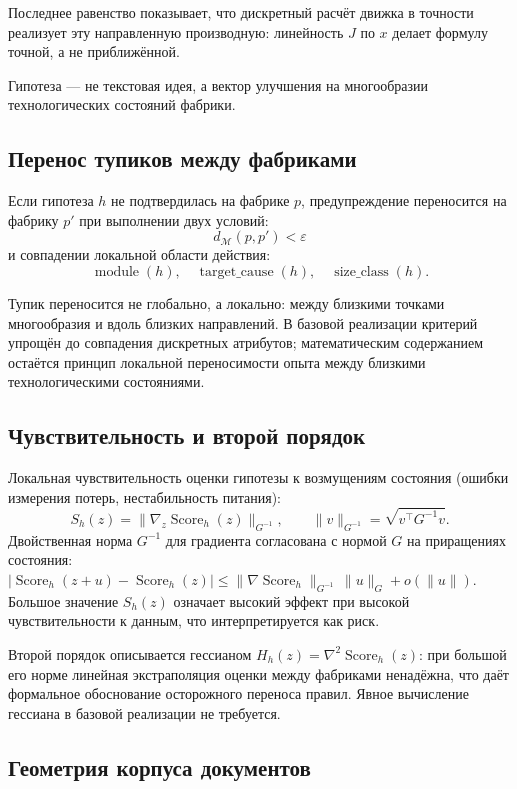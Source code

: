 \documentclass[12pt,a4paper]{article}
\newcommand{\Manifold}{\mathcal{M}}
\DeclareMathOperator{\Score}{Score}
\begin{document}
Последнее равенство показывает, что дискретный расчёт движка в точности
реализует эту направленную производную: линейность \(J\) по \(x\) делает
формулу точной, а не приближённой.

\begin{mainbox}
Гипотеза --- не текстовая идея, а вектор улучшения на многообразии
технологических состояний фабрики.
\end{mainbox}

\subsection{Перенос тупиков между фабриками}

Если гипотеза \(h\) не подтвердилась на фабрике \(p\), предупреждение
переносится на фабрику \(p'\) при выполнении двух условий:
\[
  d_\Manifold(p,p') < \varepsilon
\]
и совпадении локальной области действия:
\[
  \operatorname{module}(h),\quad
  \operatorname{target\_cause}(h),\quad
  \operatorname{size\_class}(h).
\]

Тупик переносится не глобально, а локально: между близкими точками
многообразия и вдоль близких направлений. В базовой реализации критерий
упрощён до совпадения дискретных атрибутов; математическим содержанием
остаётся принцип локальной переносимости опыта между близкими
технологическими состояниями.

\subsection{Чувствительность и второй порядок}

Локальная чувствительность оценки гипотезы к возмущениям состояния (ошибки
измерения потерь, нестабильность питания):
\[
  S_h(z) = \|\nabla_z \Score_h(z)\|_{G^{-1}},
  \qquad
  \|v\|_{G^{-1}} = \sqrt{v^\top G^{-1} v}.
\]
Двойственная норма \(G^{-1}\) для градиента согласована с нормой \(G\) на
приращениях состояния:
\(|\Score_h(z+u)-\Score_h(z)| \le
\|\nabla\Score_h\|_{G^{-1}}\,\|u\|_G + o(\|u\|)\).
Большое значение \(S_h(z)\) означает высокий эффект при высокой
чувствительности к данным, что интерпретируется как риск.

Второй порядок описывается гессианом
\(H_h(z) = \nabla^2 \Score_h(z)\): при большой его норме линейная
экстраполяция оценки между фабриками ненадёжна, что даёт формальное
обоснование осторожного переноса правил. Явное вычисление гессиана в базовой
реализации не требуется.

\subsection{Геометрия корпуса документов}
\end{document}

